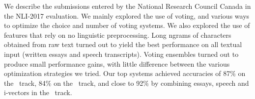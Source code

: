We describe the submissions entered by the National Research Council Canada in the NLI-2017 evaluation. We mainly explored the use of voting, and various ways to optimize the choice and number of voting systems.  We also explored the use of features that rely on no linguistic preprocessing. Long ngrams of characters obtained from raw text turned out to yield the best performance on all textual input (written essays and speech transcripts). Voting ensembles turned out to produce small performance gains, with little difference between the various optimization strategies we tried. Our top systems achieved accuracies of 87\% on the \essay\ track, 84\% on the \speech\ track, and close to 92\% by combining essays, speech and i-vectors in the \fusion\ track.
